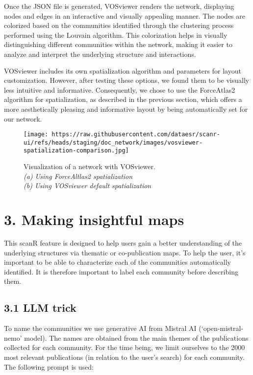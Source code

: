 \documentclass[
]{article}
\begin{document}
Once the JSON file is generated, VOSviewer renders the network,
displaying nodes and edges in an interactive and visually appealing
manner. The nodes are colorized based on the communities identified
through the clustering process performed using the Louvain algorithm.
This colorization helps in visually distinguishing different communities
within the network, making it easier to analyze and interpret the
underlying structure and interactions.

VOSviewer includes its own spatialization algorithm and parameters for
layout customization. However, after testing these options, we found
them to be visually less intuitive and informative. Consequently, we
chose to use the ForceAtlas2 algorithm for spatialization, as described
in the previous section, which offers a more aesthetically pleasing and
informative layout by being automatically set for our network.

\begin{figure}
\centering
\texttt{[image: https://raw.githubusercontent.com/dataesr/scanr-ui/refs/heads/staging/doc\_network/images/vosviewer-spatialization-comparison.jpg]}
\caption{Visualization of a network with VOSviewer.\\
\emph{(a) Using ForceAltlas2 spatialization\\
(b) Using VOSviewer default spatialization}}
\end{figure}

\hypertarget{making-insightful-maps}{%
\section{3. Making insightful maps}\label{making-insightful-maps}}

This scanR feature is designed to help users gain a better understanding
of the underlying structures via thematic or co-publication maps. To
help the user, it's important to be able to characterize each of the
communities automatically identified. It is therefore important to label
each community before describing them.

\hypertarget{llm-trick}{%
\subsection{3.1 LLM trick}\label{llm-trick}}

To name the communities we use generative AI from Mistral AI
(`open-mistral-nemo' model). The names are obtained from the main themes
of the publications collected for each community. For the time being, we
limit ourselves to the 2000 most relevant publications (in relation to
the user's search) for each community. The following prompt is used:
\end{document}
